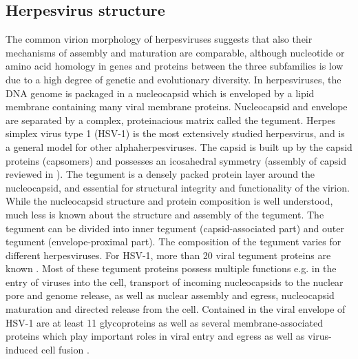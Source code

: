 \subsection{Herpesvirus structure}
The common virion morphology of herpesviruses suggests that also their mechanisms of assembly and maturation are comparable, although nucleotide or amino acid homology in genes and proteins between the three subfamilies is low due to a high degree of genetic and evolutionary diversity.
In herpesviruses, the DNA genome is packaged in a nucleocapsid which is enveloped by a lipid membrane containing many viral membrane proteins.
Nucleocapsid and envelope are separated by a complex, proteinacious matrix called the tegument.
Herpes simplex virus type 1 (HSV-1) is the most extensively studied herpesvirus, and is a general model for other alphaherpesviruses.
The capsid is built up by the capsid proteins (capsomers) and possesses an icosahedral symmetry (assembly of capsid reviewed in \cite{[4]}).
The tegument is a densely packed protein layer around the nucleocapsid, and essential for structural integrity and functionality of the virion.
While the nucleocapsid structure and protein composition is well understood, much less is known about the structure and assembly of the tegument.
The tegument can be divided into inner tegument (capsid-associated part) and outer tegument (envelope-proximal part).
The composition of the tegument varies for different herpesviruses.
For HSV-1, more than 20 viral tegument proteins are known \cite{[5, 6]}.
Most of these tegument proteins possess multiple functions e.g.
in the entry of viruses into the cell, transport of incoming nucleocapsids to the nuclear pore and genome release, as well as nuclear assembly and egress, nucleocapsid maturation and directed release from the cell.
Contained in the viral envelope of HSV-1 are at least 11 glycoproteins as well as several membrane-associated proteins which play important roles in viral entry and egress as well as virus-induced cell fusion \cite{[2, 7]}.



